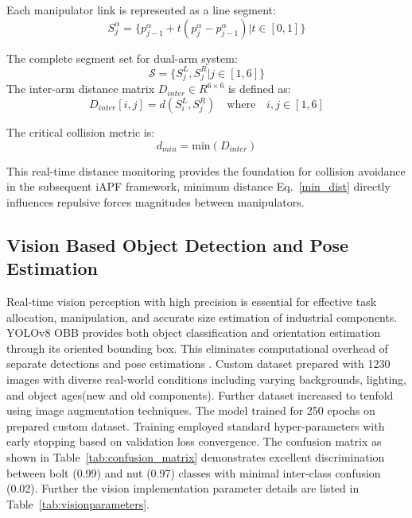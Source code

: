 \documentclass[pdflatex,sn-mathphys-num]{sn-jnl}%
\theoremstyle{thmstyleone}%
\theoremstyle{thmstylethree}%
\begin{document}
\noindent Each manipulator link is represented as a line segment:
\begin{equation}
    S^{\alpha}_{j} = \{p^{\alpha}_{j-1} + t(p^{\alpha}_{j}-p^{\alpha}_{j-1}) | t\in[0,1]\}
\end{equation}

\noindent The complete segment set for dual-arm system:
\begin{equation}
    \mathcal{S} = \{S^{L}_{j}, S^{R}_{j} | j\in[1,6]\}
\end{equation}
\noindent The inter-arm distance matrix $D_{inter} \in R^{6\times 6}$ is defined as:
\begin{equation}
    D_{inter}[i, j] = d(S^{L}_{i}, S^{R}_{j}) \quad \text{where} \quad i, j \in [1, 6]
\end{equation}

\noindent The critical collision metric is:
\begin{equation}
    d_{min} = \text{min}(D_{inter})
    \label{min_dist}
\end{equation}

This real-time distance monitoring provides the foundation for collision avoidance in the subsequent iAPF framework, minimum distance Eq.~\ref{min_dist} directly influences repulsive forces magnitudes between manipulators.
\subsection{Vision Based Object Detection and Pose Estimation}
Real-time vision perception with high precision is essential for effective task allocation, manipulation, and accurate size estimation of industrial components. YOLOv8 OBB \cite{yolov8} provides both object classification and orientation estimation through its oriented bounding box. This eliminates computational overhead of separate detections and pose estimations \cite{shiporientation}. Custom dataset prepared with 1230 images with diverse real-world conditions including varying backgrounds, lighting, and object ages(new and old components). Further dataset increased to tenfold using image augmentation techniques. The model trained for 250 epochs on prepared custom dataset. Training employed standard hyper-parameters with early stopping based on validation loss convergence. The confusion matrix as shown in Table~\ref{tab:confusion_matrix} demonstrates excellent discrimination between bolt (0.99) and nut (0.97) classes with minimal inter-class confusion (0.02). Further the vision implementation parameter details are listed in Table~\ref{tab:visionparameters}.
\end{document}
